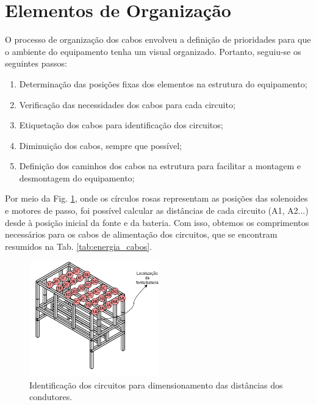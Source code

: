 \section{Elementos de Organização}

O processo de organização dos cabos envolveu a definição de prioridades para que o ambiente do equipamento tenha um visual organizado. Portanto, seguiu-se os seguintes passos:

\begin{enumerate}
    \item Determinação das posições fixas dos elementos na estrutura do equipamento;
    
    \item Verificação das necessidades dos cabos para cada circuito;
    
    \item Etiquetação dos cabos para identificação dos circuitos;
    
    \item Diminuição dos cabos, sempre que possível;
    
    \item Definição dos caminhos dos cabos na estrutura para facilitar a montagem e desmontagem do equipamento;
\end{enumerate}

Por meio da Fig. \ref{fig:energia_cabos}, onde os círculos rosas representam as posições das solenoides e motores de passo, foi possível calcular as distâncias de cada circuito (A1, A2...) desde à posição inicial da fonte e da bateria. Com isso, obtemos os comprimentos necessários para os cabos de alimentação dos circuitos, que se encontram resumidos na Tab. \ref{tab:energia_cabos}.

\begin{figure}[H]
    \centering
    \includegraphics[width=0.5\textwidth]{figuras/energia/circuitos/cabos.png}
   \caption{Identificação dos circuitos para dimensionamento das distâncias dos condutores.}
   \label{fig:energia_cabos}
   \end{figure}
   
